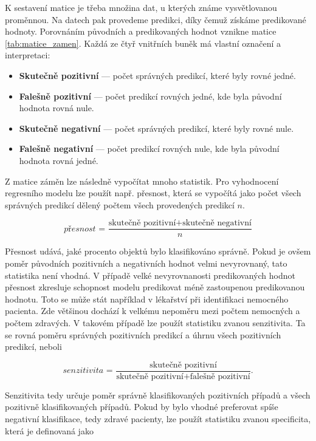 K sestavení matice je třeba množina dat, u kterých známe vysvětlovanou proměnnou. Na datech pak provedeme predikci, díky čemuž získáme predikované hodnoty. Porovnáním
původních a predikovaných hodnot vznikne matice \ref{tab:matice_zamen}. Každá ze čtyř vnitřních buněk má vlastní označení a interpretaci:

\begin{itemize}
    \item \textbf{Skutečně pozitivní} --- počet správných predikcí, které byly rovné jedné.
    \item \textbf{Falešně pozitivní} --- počet predikcí rovných jedné, kde byla původní hodnota rovná nule.
    \item \textbf{Skutečně negativní} --- počet správných predikcí, které byly rovné nule.
    \item \textbf{Falešně negativní} --- počet predikcí rovných nule, kde byla původní hodnota rovná jedné.
\end{itemize}

Z matice záměn lze následně vypočítat mnoho statistik. Pro vyhodnocení regresního modelu lze použít např. přesnost, která se vypočítá jako počet všech správných predikcí
dělený počtem všech provedených predikcí $n$.

\begin{equation}
    \textit{přesnost = } \frac{\text{skutečně pozitivní} + \text{skutečně negativní}}{n}
\end{equation}

Přesnost udává, jaké procento objektů bylo klasifikováno správně. Pokud je ovšem poměr původních pozitivních a negativních hodnot velmi nevyrovnaný,
tato statistika není vhodná. V případě velké nevyrovnanosti predikovaných hodnot přesnost zkresluje schopnost modelu predikovat méně zastoupenou predikovanou hodnotu. 
Toto se může stát například v lékařství při identifikaci nemocného pacienta. Zde většinou dochází k velkému nepoměru mezi počtem nemocných a počtem zdravých.
V takovém případě lze použít statistiku zvanou senzitivita. Ta se rovná poměru správných pozitivních predikcí a úhrnu všech pozitivních predikcí, neboli

\begin{equation}
    \textit{senzitivita = } \frac{\text{skutečně pozitivní}}{\text{skutečně pozitivní} + \text{falešně pozitivní}}.
\end{equation}

Senzitivita tedy určuje poměr správně klasifikovaných pozitivních případů a všech pozitivně klasifikovaných případů. Pokud by bylo vhodné preferovat
spíše negativní klasifikace, tedy zdravé pacienty, lze použít statistiku zvanou specificita, která je definovaná jako

